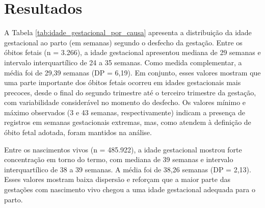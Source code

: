 %

\chapter{Resultados}


A Tabela \ref{tab:idade_gestacional_por_causa} apresenta a distribuição da idade 
gestacional ao parto (em semanas) segundo o desfecho da gestação. Entre os 
óbitos fetais (n = 3.266), a idade gestacional apresentou mediana de 29 semanas 
e intervalo interquartílico de 24 a 35 semanas. Como medida complementar, a média 
foi de 29,39 semanas (DP = 6,19). Em conjunto, esses valores mostram que uma parte 
importante dos óbitos fetais ocorreu em idades gestacionais mais precoces, desde 
o final do segundo trimestre até o terceiro trimestre da gestação, com variabilidade 
considerável no momento do desfecho. Os valores mínimo e máximo observados (3 e 43 
semanas, respectivamente) indicam a presença de registros em semanas gestacionais 
extremas, mas, como atendem à definição de óbito fetal adotada, foram mantidos 
na análise.

Entre os nascimentos vivos (n = 485.922), a idade gestacional mostrou forte 
concentração em torno do termo, com mediana de 39 semanas e intervalo interquartílico 
de 38 a 39 semanas. A média foi de 38,26 semanas (DP = 2,13). Esses valores 
mostram baixa dispersão e reforçam que a maior parte das gestações com nascimento 
vivo chegou a uma idade gestacional adequada para o parto.

\begingroup
  \setlength{\tabcolsep}{2.5pt}
  \renewcommand{\arraystretch}{0.95}

